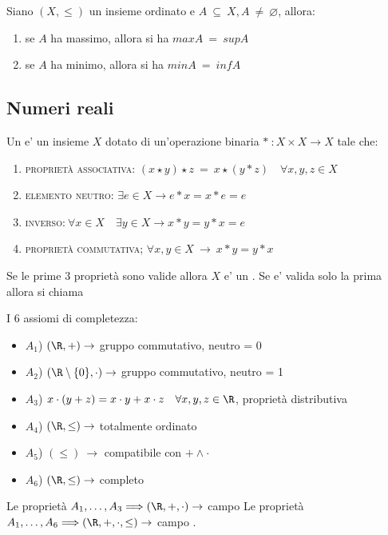 \documentclass[../appunti.tex]{subfiles}
\begin{document}
\begin{defn} Siano $(X,\leq)$ un insieme ordinato e $A\ \subseteq\ X, A\ \neq\ \varnothing $, allora:
	\begin{enumerate}
		\item se $A$ ha massimo, allora si ha $max A\ =\ sup A$
		\item se $A$ ha minimo, allora si ha $min A\ =\ inf A$
	\end{enumerate}
\end{defn}

\subsection{Numeri reali}
Un  e' un insieme $X$ dotato di un'operazione binaria $*\ : X \times X \rightarrow X$ tale che:

\begin{enumerate} 
	\item \textsc{proprietà associativa:} $(x \star y) \star z\ =\ x \star (y * z) \quad \forall x,y,z \in X$
	\item \textsc{elemento neutro:} $ \exists e \in X \rightarrow e * x = x * e = e$
	\item \textsc{inverso:}$\ \forall x \in X \quad \exists y \in X \rightarrow x * y = y * x = e$
	\item \textsc{proprietà commutativa;} $ \forall x, y \in X\ \rightarrow \ x * y = y * x$
\end{enumerate}
Se le prime 3 proprietà sono valide allora $X$ e' un . Se e' valida solo la prima allora si chiama 

\begin{defn}
I 6 assiomi di completezza:
	\begin{itemize}
		\item $A_1$) $(\R, +) \rightarrow$ gruppo commutativo, neutro = 0
		\item $A_2$) $(\R \setminus \{ 0 \} , \cdot) \rightarrow$  gruppo commutativo, neutro = 1
		\item $A_3$) $ x \cdot (y+z) = x \cdot y+x \cdot z \quad \forall x,y,z \in \R$, proprietà distributiva
		\item $A_4$) $(\R, \leq ) \rightarrow $ totalmente ordinato
		\item $A_5$) $ (\leq )\ \rightarrow $ compatibile con $ + \land \cdot $
		\item $A_6$) $(\R, \leq ) \rightarrow $ completo 

	\end{itemize}
	Le proprietà $ A_1, \dots , A_3 \Longrightarrow (\R, +, \cdot) \rightarrow $ campo \newline
	Le proprietà $ A_1, \dots , A_6 \Longrightarrow (\R, +, \cdot, \leq) \rightarrow $ campo .

\end{defn}
\end{document}
